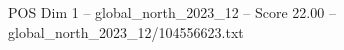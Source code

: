 \begin{textsample}{POS Dim 1 – global\_north\_2023\_12 – Score 22.00 – global\_north\_2023\_12/104556623.txt}
\end{textsample}
